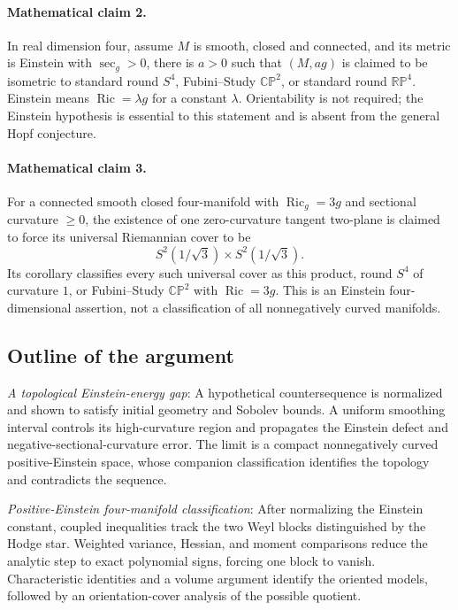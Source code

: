 \documentclass[11pt]{article}
\begin{document}
\paragraph{Mathematical claim 2.} In real dimension four, assume $M$ is smooth, closed and connected, and its metric is Einstein with $\sec_g>0$, there is $a>0$ such that $(M,ag)$ is claimed to be isometric to standard round $S^4$, Fubini--Study $\mathbb{CP}^2$, or standard round $\mathbb{RP}^4$. Einstein means $\operatorname{Ric}=\lambda g$ for a constant $\lambda$. Orientability is not required; the Einstein hypothesis is essential to this statement and is absent from the general Hopf conjecture.

\paragraph{Mathematical claim 3.} For a connected smooth closed four-manifold with $\operatorname{Ric}_g=3g$ and sectional curvature $\ge0$, the existence of one zero-curvature tangent two-plane is claimed to force its universal Riemannian cover to be \[S^2(1/\sqrt3)\times S^2(1/\sqrt3).\] Its corollary classifies every such universal cover as this product, round $S^4$ of curvature $1$, or Fubini--Study $\mathbb{CP}^2$ with $\operatorname{Ric}=3g$. This is an Einstein four-dimensional assertion, not a classification of all nonnegatively curved manifolds.

\subsection{Outline of the argument}
\textit{A topological Einstein-energy gap}: A hypothetical countersequence is normalized and shown to satisfy initial geometry and Sobolev bounds. A uniform smoothing interval controls its high-curvature region and propagates the Einstein defect and negative-sectional-curvature error. The limit is a compact nonnegatively curved positive-Einstein space, whose companion classification identifies the topology and contradicts the sequence.

\textit{Positive-Einstein four-manifold classification}: After normalizing the Einstein constant, coupled inequalities track the two Weyl blocks distinguished by the Hodge star. Weighted variance, Hessian, and moment comparisons reduce the analytic step to exact polynomial signs, forcing one block to vanish. Characteristic identities and a volume argument identify the oriented models, followed by an orientation-cover analysis of the possible quotient.
\end{document}
